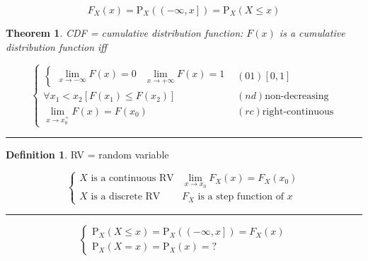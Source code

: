 \documentclass[
]{book}
\newtheorem{theorem}{Theorem}[chapter]
\theoremstyle{definition}
\newtheorem{definition}{Definition}[chapter]
\theoremstyle{definition}
\theoremstyle{definition}
\theoremstyle{definition}
\theoremstyle{remark}
\begin{document}
\[
F_{{\scriptscriptstyle X}}\left(x\right)=\mathrm{P}_{{\scriptscriptstyle X}}\left(\left(-\infty,x\right]\right)=\mathrm{P}_{{\scriptscriptstyle X}}\left(X\le x\right)
\]

\begin{theorem}
\protect\hypertarget{thm:unnamed-chunk-6}{}\label{thm:unnamed-chunk-6}CDF = cumulative distribution function: \(F\left(x\right)\) is a cumulative distribution function iff
\end{theorem}

\[
\begin{cases}
\begin{cases}
\lim\limits _{x\rightarrow-\infty}F\left(x\right)=0 & \lim\limits _{x\rightarrow+\infty}F\left(x\right)=1\end{cases} & \left(01\right)\left[0,1\right]\\
\forall x_{{\scriptscriptstyle 1}}<x_{{\scriptscriptstyle 2}}\left[F\left(x_{{\scriptscriptstyle 1}}\right)\le F\left(x_{{\scriptscriptstyle 2}}\right)\right] & \left(nd\right)\text{non-decreasing}\\
\lim\limits _{x\rightarrow x_{{\scriptscriptstyle 0}}^{+}}F\left(x\right)=F\left(x_{{\scriptscriptstyle 0}}\right) & \left(rc\right)\text{right-continuous}
\end{cases}
\]

\begin{center}\rule{0.5\linewidth}{0.5pt}\end{center}

\begin{definition}
\protect\hypertarget{def:unnamed-chunk-7}{}\label{def:unnamed-chunk-7}RV = random variable
\end{definition}

\[
\begin{cases}
X\text{ is a continuous RV} & \lim\limits _{x\rightarrow x_{{\scriptscriptstyle 0}}}F_{{\scriptscriptstyle X}}\left(x\right)=F_{{\scriptscriptstyle X}}\left(x_{{\scriptscriptstyle 0}}\right)\\
X\text{ is a discrete RV} & F_{{\scriptscriptstyle X}}\text{ is a step function of }x
\end{cases}
\]

\begin{center}\rule{0.5\linewidth}{0.5pt}\end{center}

\[
\begin{cases}
\mathrm{P}_{{\scriptscriptstyle X}}\left(X\le x\right)=\mathrm{P}_{{\scriptscriptstyle X}}\left(\left(-\infty,x\right]\right)=F_{{\scriptscriptstyle X}}\left(x\right)\\
\mathrm{P}_{{\scriptscriptstyle X}}\left(X=x\right)=\mathrm{P}_{{\scriptscriptstyle X}}\left(x\right)=?
\end{cases}
\]
\end{document}
